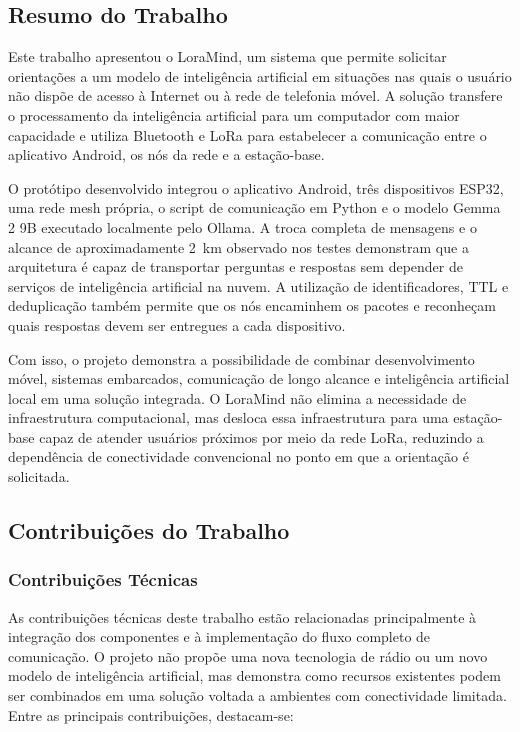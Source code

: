 \documentclass[12pt]{article}
\begin{document}
\subsection{Resumo do Trabalho}

Este trabalho apresentou o LoraMind, um sistema que permite solicitar orientações a um modelo de inteligência artificial em situações nas quais o usuário não dispõe de acesso à Internet ou à rede de telefonia móvel. A solução transfere o processamento da inteligência artificial para um computador com maior capacidade e utiliza Bluetooth e LoRa para estabelecer a comunicação entre o aplicativo Android, os nós da rede e a estação-base.

O protótipo desenvolvido integrou o aplicativo Android, três dispositivos ESP32, uma rede mesh própria, o script de comunicação em Python e o modelo Gemma 2 9B executado localmente pelo Ollama. A troca completa de mensagens e o alcance de aproximadamente 2~km observado nos testes demonstram que a arquitetura é capaz de transportar perguntas e respostas sem depender de serviços de inteligência artificial na nuvem. A utilização de identificadores, TTL e deduplicação também permite que os nós encaminhem os pacotes e reconheçam quais respostas devem ser entregues a cada dispositivo.

Com isso, o projeto demonstra a possibilidade de combinar desenvolvimento móvel, sistemas embarcados, comunicação de longo alcance e inteligência artificial local em uma solução integrada. O LoraMind não elimina a necessidade de infraestrutura computacional, mas desloca essa infraestrutura para uma estação-base capaz de atender usuários próximos por meio da rede LoRa, reduzindo a dependência de conectividade convencional no ponto em que a orientação é solicitada.

\subsection{Contribuições do Trabalho}

\subsubsection{Contribuições Técnicas}

As contribuições técnicas deste trabalho estão relacionadas principalmente à integração dos componentes e à implementação do fluxo completo de comunicação. O projeto não propõe uma nova tecnologia de rádio ou um novo modelo de inteligência artificial, mas demonstra como recursos existentes podem ser combinados em uma solução voltada a ambientes com conectividade limitada. Entre as principais contribuições, destacam-se:
\end{document}
